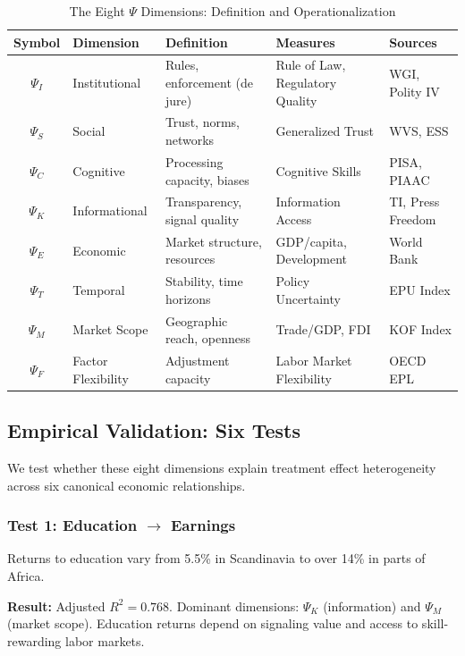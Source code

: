 \documentclass[12pt,a4paper]{article}
\begin{document}
\begin{table}[htbp]
\centering
\caption{The Eight $\Psi$ Dimensions: Definition and Operationalization}
\label{tab:psi-dimensions-appv}
\small
\begin{tabular}{@{}cllll@{}}
\toprule
\textbf{Symbol} & \textbf{Dimension} & \textbf{Definition} & \textbf{Measures} & \textbf{Sources} \\
\midrule
$\Psi_I$ & Institutional & Rules, enforcement (de jure) & Rule of Law, Regulatory Quality & WGI, Polity IV \\
$\Psi_S$ & Social & Trust, norms, networks & Generalized Trust & WVS, ESS \\
$\Psi_C$ & Cognitive & Processing capacity, biases & Cognitive Skills & PISA, PIAAC \\
$\Psi_K$ & Informational & Transparency, signal quality & Information Access & TI, Press Freedom \\
$\Psi_E$ & Economic & Market structure, resources & GDP/capita, Development & World Bank \\
$\Psi_T$ & Temporal & Stability, time horizons & Policy Uncertainty & EPU Index \\
$\Psi_M$ & Market Scope & Geographic reach, openness & Trade/GDP, FDI & KOF Index \\
$\Psi_F$ & Factor Flexibility & Adjustment capacity & Labor Market Flexibility & OECD EPL \\
\bottomrule
\end{tabular}
\end{table}

\subsection{Empirical Validation: Six Tests}

We test whether these eight dimensions explain treatment effect heterogeneity across six canonical economic relationships.

\subsubsection{Test 1: Education $\rightarrow$ Earnings}

Returns to education vary from 5.5\% in Scandinavia to over 14\% in parts of Africa. 

\textbf{Result:} Adjusted $R^2 = 0.768$. Dominant dimensions: $\Psi_K$ (information) and $\Psi_M$ (market scope). Education returns depend on signaling value and access to skill-rewarding labor markets.
\end{document}
